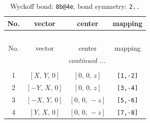 \documentclass[fleqn,8pt]{jsarticle}
\begin{document}
\renewcommand{\arraystretch}{1.2}
\begin{longtable}{cccc}
\caption{Wyckoff bond: {\tt 8b@4e}, bond symmetry: {\tt 2..}}
 \\
 \hline \hline
No. & vector & center & mapping \\ \hline \endfirsthead

\multicolumn{3}{l}{\tablename\ \thetable{}} \\
 \hline \hline
No. & vector & center & mapping \\ \hline \endhead

 \hline \hline
\multicolumn{3}{r}{\footnotesize\it continued ...} \\ \endfoot

 \hline \hline
\multicolumn{3}{r}{} \\ \endlastfoot

1 & $\left[ X,\, Y,\, 0 \right]$ & $\left[ 0,\, 0,\, z \right]$ & {\tt [1,-2]} \\ \hline
2 & $\left[ - Y,\, X,\, 0 \right]$ & $\left[ 0,\, 0,\, z \right]$ & {\tt [3,-4]} \\ \hline
3 & $\left[ - X,\, Y,\, 0 \right]$ & $\left[ 0,\, 0,\, - z \right]$ & {\tt [5,-6]} \\ \hline
4 & $\left[ Y,\, X,\, 0 \right]$ & $\left[ 0,\, 0,\, - z \right]$ & {\tt [7,-8]} \\
\end{longtable}
\renewcommand{\arraystretch}{1.2}
\end{document}
